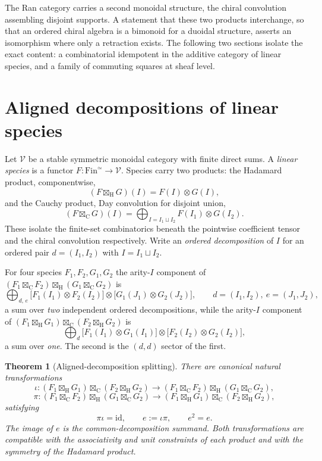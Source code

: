 \documentclass[11pt,reqno]{amsart}
\newtheorem{theorem}{Theorem}[section]
\theoremstyle{definition}
\theoremstyle{remark}
\providecommand{\Fin}{\mathrm{Fin}}
\providecommand{\id}{\mathrm{id}}
\providecommand{\Hd}{\boxtimes_{\mathrm{H}}}
\providecommand{\Cy}{\boxtimes_{\mathrm{C}}}
\begin{document}
The Ran category carries a second monoidal structure, the chiral
convolution assembling disjoint supports. A statement that these two
products interchange, so that an ordered chiral algebra is a bimonoid for
a duoidal structure, asserts an isomorphism where only a retraction
exists. The following two sections isolate the exact content: a
combinatorial idempotent in the additive category of linear species, and
a family of commuting squares at sheaf level.

\section{Aligned decompositions of linear species}

Let $\mathcal V$ be a stable symmetric monoidal category with finite
direct sums. A \emph{linear species} is a functor
$F\colon \Fin^{\simeq}\to\mathcal V$. Species carry two products: the
Hadamard product, componentwise,
\[
  (F \Hd G)(I) = F(I)\otimes G(I),
\]
and the Cauchy product, Day convolution for disjoint union,
\[
  (F \Cy G)(I) = \bigoplus_{I = I_1\sqcup I_2} F(I_1)\otimes G(I_2).
\]
These isolate the finite-set combinatorics beneath the pointwise
coefficient tensor and the chiral convolution respectively. Write an
\emph{ordered decomposition} of $I$ for an ordered pair $d=(I_1,I_2)$
with $I=I_1\sqcup I_2$.

For four species $F_1,F_2,G_1,G_2$ the arity-$I$ component of
$(F_1\Cy F_2)\Hd(G_1\Cy G_2)$ is
\[
  \bigoplus_{d,\,e}
  \bigl[F_1(I_1)\otimes F_2(I_2)\bigr]\otimes
  \bigl[G_1(J_1)\otimes G_2(J_2)\bigr],
  \qquad d=(I_1,I_2),\ e=(J_1,J_2),
\]
a sum over \emph{two} independent ordered decompositions, while the
arity-$I$ component of $(F_1\Hd G_1)\Cy(F_2\Hd G_2)$ is
\[
  \bigoplus_{d}
  \bigl[F_1(I_1)\otimes G_1(I_1)\bigr]\otimes
  \bigl[F_2(I_2)\otimes G_2(I_2)\bigr],
\]
a sum over \emph{one}. The second is the $(d,d)$ sector of the first.

\begin{theorem}[Aligned-decomposition splitting]
\label{thm:aligned-splitting}
There are canonical natural transformations
\[
  \iota\colon (F_1\Hd G_1)\Cy(F_2\Hd G_2)
    \longrightarrow (F_1\Cy F_2)\Hd(G_1\Cy G_2),
\]
\[
  \pi\colon (F_1\Cy F_2)\Hd(G_1\Cy G_2)
    \longrightarrow (F_1\Hd G_1)\Cy(F_2\Hd G_2),
\]
satisfying
\[
  \pi\iota = \id,\qquad e := \iota\pi,\qquad e^2 = e .
\]
The image of $e$ is the common-decomposition summand. Both
transformations are compatible with the associativity and unit
constraints of each product and with the symmetry of the Hadamard
product.
\end{theorem}
\end{document}
